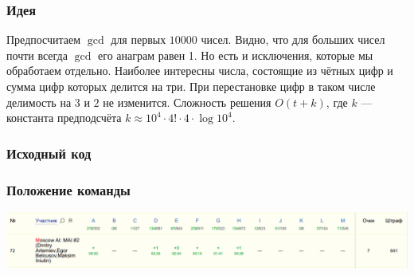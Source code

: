 \documentclass[12pt]{article}
\begin{document}
\subsubsection*{Идея}
Предпосчитаем $\gcd$ для первых $10000$ чисел. Видно, что для больших чисел почти всегда $\gcd$ его анаграм равен 1. Но есть и исключения, которые мы обработаем отдельно. Наиболее интересны числа, состоящие из чётных цифр и сумма цифр которых делится на три. При перестановке цифр в таком числе делимость на $3$ и $2$ не изменится. Сложность решения $O(t +k)$, где $k$ --- константа предподсчёта $k \approx 10 ^ 4 \cdot 4! \cdot 4 \cdot \log{10 ^ 4}$.
\subsubsection*{Исходный код}

\subsubsection*{Положение команды}
\includegraphics[scale=0.25]{images/moscow_regional.png}\newline\noindent
\pagebreak
\end{document}
